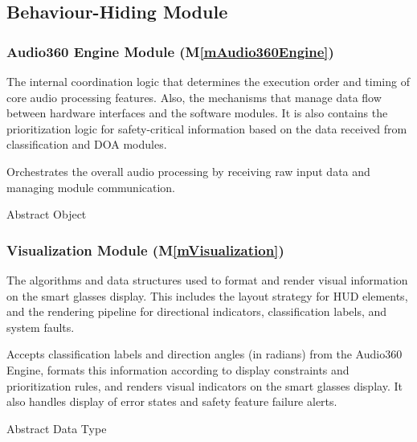 \documentclass[12pt, titlepage]{article}
\newcommand{\mref}[1]{M\ref{#1}}
\begin{document}
\subsection{Behaviour-Hiding Module}

\subsubsection{Audio360 Engine Module (\mref{mAudio360Engine})}

\begin{description}[labelindent=0.5cm]
\item[Secrets:] The internal coordination logic that determines the execution
  order and timing of core audio processing features. Also, the mechanisms that
  manage data flow between hardware interfaces and the software modules.
  It is also contains the prioritization logic for safety-critical information
  based on the data received from classification and DOA modules.
\item[Services:] Orchestrates the overall audio processing by receiving raw
  input data and managing module communication.
\item[Implemented By:] \progname
\item[Type of Module:] Abstract Object
\end{description}

\subsubsection{Visualization Module (\mref{mVisualization})}
\begin{description}[labelindent=0.5cm]
  \item[Secrets:] The algorithms and data structures used to format and render
  visual information on the smart glasses display. This includes the layout
  strategy for HUD elements, and the rendering pipeline for directional
  indicators, classification labels, and system faults.
  \item[Services:] Accepts classification labels and direction angles (in
  radians) from the Audio360 Engine, formats this information according to
  display constraints and prioritization rules, and renders visual indicators on
  the smart glasses display. It also handles
  display of error states and safety feature failure alerts.
  \item[Implemented By:] \progname
  \item[Type of Module:] Abstract Data Type 
\end{description}
\end{document}
